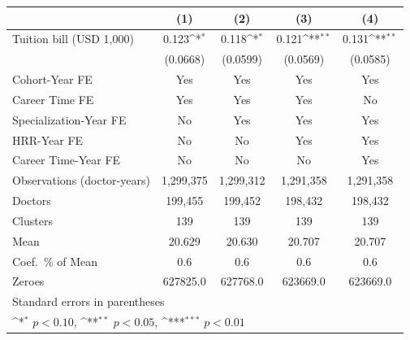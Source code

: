 {
\def\sym#1{\ifmmode^{#1}\else\(^{#1}\)\fi}
\begin{tabular}{l*{4}{c}}
\hline\hline
                    &\multicolumn{1}{c}{(1)}         &\multicolumn{1}{c}{(2)}         &\multicolumn{1}{c}{(3)}         &\multicolumn{1}{c}{(4)}         \\
\hline
Tuition bill (USD 1,000)&       0.123\sym{*}  &       0.118\sym{*}  &       0.121\sym{**} &       0.131\sym{**} \\
                    &    (0.0668)         &    (0.0599)         &    (0.0569)         &    (0.0585)         \\
[1em]
Cohort-Year FE      &         Yes         &         Yes         &         Yes         &         Yes         \\
[1em]
Career Time FE      &         Yes         &         Yes         &         Yes         &          No         \\
[1em]
Specialization-Year FE&          No         &         Yes         &         Yes         &         Yes         \\
[1em]
HRR-Year FE         &          No         &          No         &         Yes         &         Yes         \\
[1em]
Career Time-Year FE &          No         &          No         &          No         &         Yes         \\
\hline
Observations (doctor-years)&   1,299,375         &   1,299,312         &   1,291,358         &   1,291,358         \\
Doctors             &     199,455         &     199,452         &     198,432         &     198,432         \\
Clusters            &         139         &         139         &         139         &         139         \\
Mean                &      20.629         &      20.630         &      20.707         &      20.707         \\
Coef.\ \% of Mean   &         0.6         &         0.6         &         0.6         &         0.6         \\
Zeroes              &    627825.0         &    627768.0         &    623669.0         &    623669.0         \\
\hline\hline
\multicolumn{5}{l}{\footnotesize Standard errors in parentheses}\\
\multicolumn{5}{l}{\footnotesize \sym{*} \(p<0.10\), \sym{**} \(p<0.05\), \sym{***} \(p<0.01\)}\\
\end{tabular}
}
